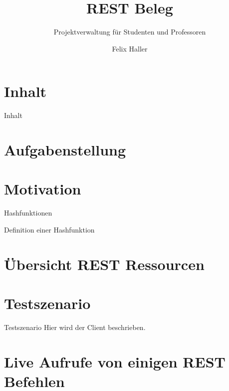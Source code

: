 \documentclass{beamer}
\author{Felix Haller}
\title{REST Beleg}
\subtitle{Projektverwaltung für Studenten und Professoren}
\institute{IF13wI-B}
\date{}
\begin{document}
	\maketitle

	\nextframenocontents

	\section*{Inhalt}
	\begin{frame}{Inhalt}
		\tableofcontents
	\end{frame}
	\section{Aufgabenstellung}
	
	\section{Motivation}
		\begin{frame}{Hashfunktionen}
		\end{frame}
		\begin{frame}[t]{Definition einer Hashfunktion}	
		\end{frame}
	\section{Übersicht REST Ressourcen}
	\section{Testszenario}
		\begin{frame}{Testszenario}
			Hier wird der Client beschrieben.
		\end{frame}
		
	\section{Live Aufrufe von einigen REST Befehlen}
	
	
\end{document}
